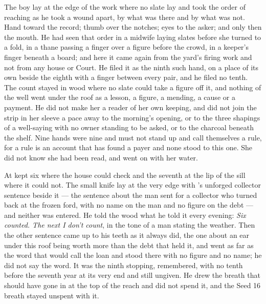 The boy lay at the edge of the work where no slate lay and took the order of reaching as he took a wound apart, by what was there and by what was not. Hand toward the record; thumb over the notches; eyes to the asker; and only then the mouth. He had seen that order in a midwife laying slates before she turned to a fold, in a thane passing a finger over a figure before the crowd, in a keeper's finger beneath a board; and here it came again from the yard's firing work and not from any house or Court. He filed it as the ninth such hand, on a place of its own beside the eighth with a finger between every pair, and he filed no tenth. The count stayed in wood where no slate could take a figure off it, and nothing of the well went under the roof as a lesson, a figure, a mending, a cause or a payment. He did not make her a reader of her own keeping, and did not join the strip in her sleeve a pace away to the morning's opening, or to the three shapings of a well-saying with no owner standing to be asked, or to the charcoal beneath the shelf. Nine hands were nine and must not stand up and call themselves a rule, for a rule is an account that has found a payer and none stood to this one. She did not know she had been read, and went on with her water.

\scenebreak

At   kept six where the house could check and the seventh at the lip of the sill where it could not. The small knife lay at the very edge with 's unforged collector sentence beside it --- the sentence about the man sent for a collector who turned back at the frozen ford, with no name on the man and no figure on the debt --- and neither was entered. He told the wood what he told it every evening: \emph{Six counted. The next I don't count}, in the tone of a man stating the weather. Then the other sentence came up to his teeth as it always did, the one about an ear under this roof being worth more than the debt that held it, and went as far as the word that would call the loan and stood there with no figure and no name; he did not say the word. It was the ninth stopping, remembered, with no tenth before the seventh year at its very end and still ungiven. He drew the breath that should have gone in at the top of the reach and did not spend it, and the Seed 16 breath stayed unspent with it.

